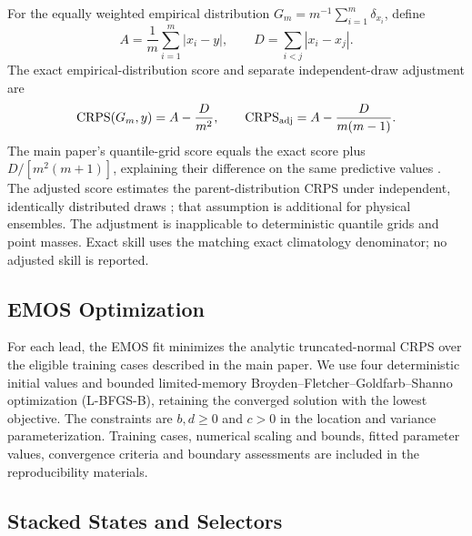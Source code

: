 \documentclass[APA,STIX1COL]{WileyNJD-v2}
\begin{document}
For the equally weighted empirical distribution $G_m=m^{-1}\sum_{i=1}^m\delta_{x_i}$, define
\[
A=\frac1m\sum_{i=1}^m|x_i-y|,\qquad
D=\sum_{i<j}|x_i-x_j|.
\]
The exact empirical-distribution score and separate independent-draw adjustment are
\[
\mathrm{CRPS}(G_m,y)=A-\frac{D}{m^2},\qquad
\mathrm{CRPS}_{\rm adj}=A-\frac{D}{m(m-1)}.
\]
The main paper's quantile-grid score equals the exact score plus $D/[m^2(m+1)]$, explaining their difference on the same predictive values \citep{zamo2018crps}. The adjusted score estimates the parent-distribution CRPS under independent, identically distributed draws \citep{ferro2014fair}; that assumption is additional for physical ensembles. The adjustment is inapplicable to deterministic quantile grids and point masses. Exact skill uses the matching exact climatology denominator; no adjusted skill is reported.

\subsection{EMOS Optimization}
\label{app:emoscomputation}

For each lead, the EMOS fit minimizes the analytic truncated-normal CRPS over the eligible training cases described in the main paper. We use four deterministic initial values and bounded limited-memory Broyden--Fletcher--Goldfarb--Shanno optimization (L-BFGS-B), retaining the converged solution with the lowest objective. The constraints are \(b,d\geq0\) and \(c>0\) in the location and variance parameterization. Training cases, numerical scaling and bounds, fitted parameter values, convergence criteria and boundary assessments are included in the reproducibility materials.

\subsection{Stacked States and Selectors}
\end{document}

